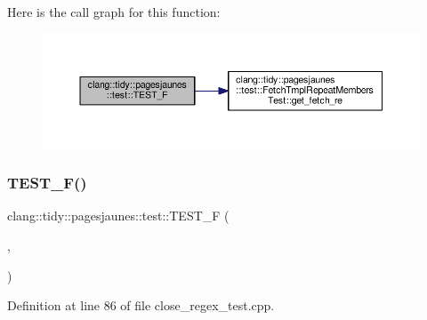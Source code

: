 Here is the call graph for this function\+:
\nopagebreak
\begin{figure}[H]
\begin{center}
\leavevmode
\includegraphics[width=350pt]{namespaceclang_1_1tidy_1_1pagesjaunes_1_1test_abf1aca281ebebf3e7b6dec0e2dd308d1_cgraph}
\end{center}
\end{figure}
\mbox{\label{namespaceclang_1_1tidy_1_1pagesjaunes_1_1test_ab46676a22ac6f764d809938617f4c9e1}} 
\subsubsection{\texorpdfstring{T\+E\+S\+T\+\_\+\+F()}{TEST\_F()}\hspace{0.1cm}{\footnotesize\ttfamily [19/57]}}
{\footnotesize\ttfamily clang\+::tidy\+::pagesjaunes\+::test\+::\+T\+E\+S\+T\+\_\+F (\begin{DoxyParamCaption}\item[{\hyperlink{classclang_1_1tidy_1_1pagesjaunes_1_1test_1_1_close_regex_test}{Close\+Regex\+Test}}]{,  }\item[{Regex\+Matching\+Weird\+Syntax}]{ }\end{DoxyParamCaption})}



Definition at line 86 of file close\+\_\+regex\+\_\+test.\+cpp.


